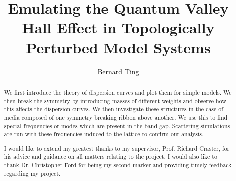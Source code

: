 \documentclass[a4paper, twoside]{report}
\title{Emulating the Quantum Valley Hall Effect in Topologically Perturbed Model Systems}
\author{Bernard Ting}
\begin{document}


\begin{abstract}
We first introduce the theory of dispersion curves and plot them for simple
models. We then break the symmetry by introducing masses of different weights
and observe how this affects the dispersion curves. We then investigate these
structures in the case of media composed of one symmetry breaking ribbon above
another. We use this to find special frequencies or modes which are present in
the band gap. Scattering simulations are run with these frequencies induced to
the lattice to confirm our analysis.
\end{abstract}

\renewcommand{\abstractname}{Acknowledgements}
\begin{abstract}
I would like to extend my greatest thanks to my supervisor, Prof. Richard
Craster, for his advice and guidance on all matters relating to the project. I
would also like to thank Dr. Christopher Ford for being my second marker and
providing timely feedback regarding my project.
\end{abstract}

\tableofcontents











\end{document}
